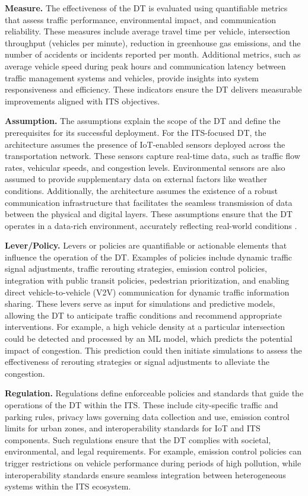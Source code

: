 \textbf{Measure.} The effectiveness of the DT is evaluated using quantifiable metrics that assess traffic performance, environmental impact, and communication reliability. These measures include average travel time per vehicle, intersection throughput (vehicles per minute), reduction in greenhouse gas emissions, and the number of accidents or incidents reported per month. Additional metrics, such as average vehicle speed during peak hours and communication latency between traffic management systems and vehicles, provide insights into system responsiveness and efficiency. These indicators ensure the DT delivers measurable improvements aligned with ITS objectives.


\textbf{Assumption.} The assumptions explain the scope of the DT and define the prerequisites for its successful deployment. For the ITS-focused DT, the architecture assumes the presence of IoT-enabled sensors deployed across the transportation network. These sensors capture real-time data, such as traffic flow rates, vehicular speeds, and congestion levels. Environmental sensors are also assumed to provide supplementary data on external factors like weather conditions. Additionally, the architecture assumes the existence of a robust communication infrastructure that facilitates the seamless transmission of data between the physical and digital layers. These assumptions ensure that the DT operates in a data-rich environment, accurately reflecting real-world conditions \cite{9745481}.


\textbf{Lever/Policy.} Levers or policies are quantifiable or actionable elements that influence the operation of the DT. Examples of policies include dynamic traffic signal adjustments, traffic rerouting strategies, emission control policies, integration with public transit policies, pedestrian prioritization, and enabling direct vehicle-to-vehicle (V2V) communication for dynamic traffic information sharing. These levers serve as input for simulations and predictive models, allowing the DT to anticipate traffic conditions and recommend appropriate interventions. For example, a high vehicle density at a particular intersection could be detected and processed by an ML model, which predicts the potential impact of congestion. This prediction could then initiate simulations to assess the effectiveness of rerouting strategies or signal adjustments to alleviate the congestion.



\textbf{Regulation.} Regulations define enforceable policies and standards that guide the operations of the DT within the ITS. These include city-specific traffic and parking rules, privacy laws governing data collection and use, emission control limits for urban zones, and interoperability standards for IoT and ITS components. Such regulations ensure that the DT complies with societal, environmental, and legal requirements. For example, emission control policies can trigger restrictions on vehicle performance during periods of high pollution, while interoperability standards ensure seamless integration between heterogeneous systems within the ITS ecosystem.


